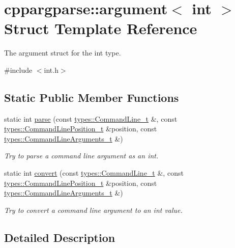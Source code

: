 \hypertarget{structcppargparse_1_1argument_3_01int_01_4}{}\section{cppargparse\+:\+:argument$<$ int $>$ Struct Template Reference}
\label{structcppargparse_1_1argument_3_01int_01_4}


The argument struct for the int type.  




{\ttfamily \#include $<$int.\+h$>$}

\subsection*{Static Public Member Functions}
\begin{DoxyCompactItemize}
\item 
static int \hyperlink{structcppargparse_1_1argument_3_01int_01_4_af6a2f748b086ad7122f7bb6affbe354e}{parse} (const \hyperlink{types_8h_a80adf2418b7ce9fe616698efa7533ecf}{types\+::\+Command\+Line\+\_\+t} \&, const \hyperlink{types_8h_a43b4f43f8940de1bf09ced6f1b668053}{types\+::\+Command\+Line\+Position\+\_\+t} \&position, const \hyperlink{types_8h_a003c660afe2ee9c6cc39aea966e8926d}{types\+::\+Command\+Line\+Arguments\+\_\+t} \&)
\begin{DoxyCompactList}\small\item\em Try to parse a command line argument as an int. \end{DoxyCompactList}\item 
static int \hyperlink{structcppargparse_1_1argument_3_01int_01_4_a8c3b45ea01897660bf5d1e5f7c9d7c41}{convert} (const \hyperlink{types_8h_a80adf2418b7ce9fe616698efa7533ecf}{types\+::\+Command\+Line\+\_\+t} \&, const \hyperlink{types_8h_a43b4f43f8940de1bf09ced6f1b668053}{types\+::\+Command\+Line\+Position\+\_\+t} \&position, const \hyperlink{types_8h_a003c660afe2ee9c6cc39aea966e8926d}{types\+::\+Command\+Line\+Arguments\+\_\+t} \&)
\begin{DoxyCompactList}\small\item\em Try to convert a command line argument to an int value. \end{DoxyCompactList}\end{DoxyCompactItemize}


\subsection{Detailed Description}
